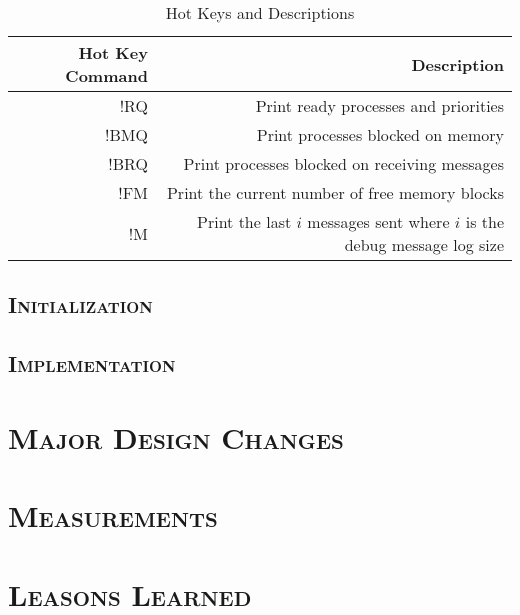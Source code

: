 \documentclass[oneside]{report}
\begin{document}
\begin{table}[h]
    \caption{Hot Keys and Descriptions}
    \label{hot_keys_table}
    \begin{tabular}{| r | r |}
        \hline
        Hot Key Command & Description \\
        \hline
        !RQ & Print ready processes and priorities \\ 
        !BMQ & Print processes blocked on memory \\ 
        !BRQ & Print processes blocked on receiving messages \\ 
        !FM & Print the current number of free memory blocks \\ 
        !M & Print the last $i$ messages sent where $i$ is the debug message
        log size \\
        \hline
    \end{tabular}
\end{table}

\section{\textsc{Initialization}}

\section{\textsc{Implementation}}

\chapter{\textsc{Major Design Changes}}

\chapter{\textsc{Measurements}}

\chapter{\textsc{Leasons Learned}}
\end{document}
